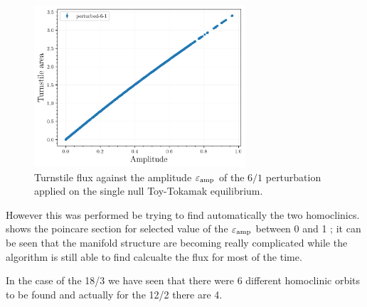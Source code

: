 \begin{figure}[H]
    \centering
    \includegraphics[width=0.7\textwidth]{images/amplitudescan/turnstile_area.png}
    \caption{Turnstile flux against the amplitude $\varepsilon_\text{amp}$ of the $6/1$ perturbation applied on the single null Toy-Tokamak equilibrium.}
    \label{fig:scan-6-1}
\end{figure}

However this was performed be trying to find automatically the two homoclinics.  shows the poincare section for selected value of the $\varepsilon_\text{amp}$ between 0 and 1 ; it can be seen that the manifold structure are becoming really complicated while the algorithm is still able to find calcualte the flux for most of the time.

In the case of the 18/3 we have seen that there were 6 different homoclinic orbits to be found and actually for the 12/2 there are 4. 

